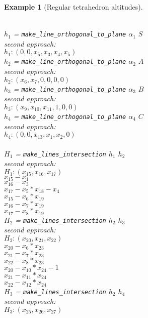 \documentclass[final,1p,times,authoryear]{elsarticle}
\newtheorem{example}[theorem]{Example}
\begin{document}
\begin{example}[Regular tetrahedron altitudes]
\begin{footnotesize}
\begin{tabbing}
 \\
\> $h_1$ = {\tt make\_line\_orthogonal\_to\_plane} $\alpha_1$ $S$ \\
second approach: \\
$h_1: (0, 0, x_5, x_3, x_4, x_5)$ \\
\> $h_2$ = {\tt make\_line\_orthogonal\_to\_plane} $\alpha_2$ $A$ \\
second approach: \\
$h_2: (x_6, x_7, 0, 0, 0, 0) $ \\
\> $h_3$ = {\tt make\_line\_orthogonal\_to\_plane} $\alpha_3$ $B$ \\
second approach: \\
$h_3: (x_9, x_{10}, x_{11}, 1, 0, 0)$ \\
\> $h_4$ = {\tt make\_line\_orthogonal\_to\_plane} $\alpha_4$ $C$ \\
second approach: \\
$h_4: (0, 0, x_{13}, x_1, x_2, 0)$ \\
 \\
\> $H_1$ = {\tt make\_lines\_intersection} $h_1$ $h_2$ \\
second approach: \\
  $H_1 : (x_{15}, x_{16}, x_{17})$ \\
  $x_{15}  -  x_1$ \\
  $x_{16}  -  x_3$ \\
  $x_{17}  -  x_5*x_{18}  -  x_4$ \\
  $x_{15}  -  x_6*x_{19}$ \\
  $x_{16}  -  x_7*x_{19}$ \\
  $x_{17}  -  x_8*x_{19}$ \\
\> $H_2$ = {\tt make\_lines\_intersection} $h_2$ $h_3$ \\
second approach: \\
 $H_2 : (x_{20}, x_{21}, x_{22})$ \\
   $x_{20}  -  x_6*x_{23}$ \\
   $x_{21}  -  x_7*x_{23}$ \\
   $x_{22}  -  x_8*x_{23}$ \\
   $x_{20}  -  x_{10}*x_{24}  -1$ \\
   $x_{21}  -  x_{11}*x_{24}$ \\
   $x_{22}  -  x_{12}*x_{24}$ \\
\> $H_3$ = {\tt make\_lines\_intersection} $h_2$ $h_4$ \\
second approach: \\
 $H_3 : (x_{25}, x_{26}, x_{27})$ \\

\end{tabbing}
\end{footnotesize}
\end{example}
\end{document}
